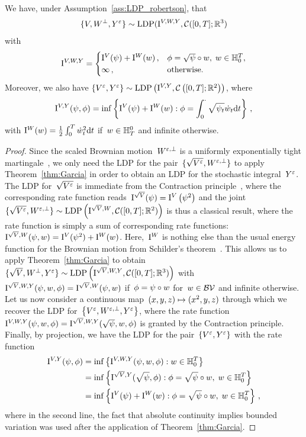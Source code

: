 \begin{theorem}\label{thm:garciaLDP}
We have, under Assumption~\ref{ass:LDP_robertson}, that
$$\{V, W^\perp, Y^{\varepsilon}\}\sim\mathrm{LDP}(\mathrm{I}^{V, W, Y}, \mathcal{C}([0,T]; \mathbb{R}^3)$$
with
\[
\mathrm{I}^{V, W, Y} = 
\begin{cases} \mathrm{I}^{V}(\psi) + \mathrm{I}^{W}(w)\,, & \phi=\sqrt\psi\circ w,\; w\in \mathbb{H}_0^T, \\
\infty\,, & \text{otherwise}.
\end{cases}
\]
Moreover, we also have
$\{V^{\varepsilon}, Y^{\varepsilon}\}\sim\mathrm{LDP}\left(\mathrm{I}^{V,Y},\mathcal{C}\left([0,T]; \mathbb{R}^2\right)\right)$, where
$$
\II^{V,Y}(\psi, \phi)=\inf \left\{\IIV(\psi) + \IIW(w): \phi = \int_{0}^{\cdot} \sqrt{\psi_{t}} \dot{w}_{t} \D t\right\}\,, %
$$
with
$\mathrm{I}^{W}(w) = \frac{1}{2} \int_{0}^{T} \dot{w}_{t}^{2} \mathrm{d} t$
if~$w \in \mathbb{H}_{T}^{0}$ and infinite otherwise.
\end{theorem}
\begin{proof}
Since the scaled Brownian motion~$W^{\varepsilon,\perp}$ is a uniformly exponentially tight martingale~\cite[Example~2.1]{Garcia2007AIntegrals}, we only need the LDP for the pair~$\{\sqrt{V^\varepsilon}, W^{\varepsilon, \perp}\}$ to apply Theorem~\ref{thm:Garcia} in order to obtain an LDP for the stochastic integral~$Y^\varepsilon$. 
The LDP for~$\sqrt{V^\varepsilon}$ is immediate from the Contraction principle~\cite[Theorem 4.2.1]{Dembo2010LargeApplications}, where the corresponding rate function reads~$\mathrm{I}^{\sqrt{V}}(\psi) = \mathrm{I}^{V}\left(\psi^2\right)$ and the joint~$\{\sqrt{V^{\varepsilon}}, W^{\varepsilon,\perp}\}\sim\mathrm{LDP}\left(\mathrm{I}^{\sqrt{V}, W}, \mathcal{C}([0,T]; \mathbb{R}^2)\right)$ is thus a classical result,
where the rate function is simply a sum of corresponding rate functions:~$\mathrm{I}^{\sqrt{V}, W}(\psi, w)=\mathrm{I}^{V}(\psi^2) + \mathrm{I}^{W}(w)$. Here,~$\mathrm{I}^{W}$ is nothing else than the usual energy function for the Brownian motion from Schilder's theorem~\cite{Schilder1966AsymptoticIntegrals}. This allows us to apply Theorem~\ref{thm:Garcia} to obtain~$\{\sqrt{V}, W^\perp, Y^{\varepsilon}\}\sim\mathrm{LDP}\left(\mathrm{I}^{\sqrt{V}, W, Y}, \mathcal{C}([0,T]; \mathbb{R}^3)\right)$ with~$\mathrm{I}^{\sqrt{V}, W, Y}(\psi, w, \phi) =\nobreak \mathrm{I}^{\sqrt{V}, W}(\psi, w)$ if~${\phi=\nobreak\psi\circ w}$ for~$w\in\mathcal{BV}$ and infinite otherwise. Let us now consider a continuous map~$(x,y,z) \mapsto\nobreak (x^2, y, z)$ through which we recover the LDP for~$\left\{V^\varepsilon, W^{\varepsilon,\perp}, Y^\varepsilon\right\}$, where the rate function~$\mathrm{I}^{V,W,Y}(\psi, w, \phi) =\nobreak \mathrm{I}^{\sqrt V,W,Y}(\sqrt\psi, w, \phi)$ is granted by the Contraction principle. Finally, by projection, we have the LDP for the pair~$\{V^\varepsilon, Y^\varepsilon\}$ with the rate function
\begin{align*}
\mathrm{I}^{V,Y}(\psi,\phi) &= \inf\left\{\mathrm{I}^{V,W,Y}(\psi, w, \phi): w\in \mathbb{H}_0^T\right\} \\
&= \inf\left\{\mathrm{I}^{\sqrt V,Y}(\sqrt\psi,\phi): \phi = \sqrt\psi\circ w,\; w\in \mathbb{H}_0^T\right\} \\ 
&= \inf\left\{\mathrm{I}^{V}(\psi) + \mathrm{I}^{W}(w): \phi=\sqrt\psi\circ w,\; w\in \mathbb{H}_0^T\right\}\,,
\end{align*}
where in the second line, the fact that absolute continuity implies bounded variation was used after the application of Theorem~\ref{thm:Garcia}.
\end{proof}
